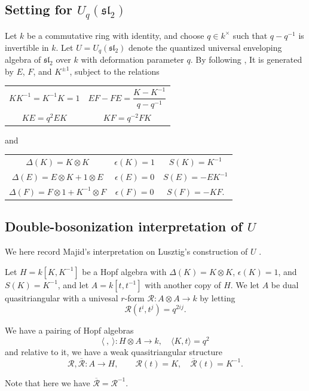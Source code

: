 
\subsection*{Setting for $U_q(\mathfrak{sl}_2)$}

Let $k$ be a commutative ring with identity, and choose $q \in k^\times$ such
that $q-q^{-1}$ is invertible in $k$.
Let $U = U_q(\mathfrak{sl}_2)$ denote the quantized universal enveloping
algebra of $\mathfrak{sl}_2$ over $k$ with deformation parameter $q$. 
By following \cite{Ohtsuki}, It is generated by $E$, $F$, and $K^{\pm 1}$, subject to the relations

\begin{center}
    \renewcommand{\arraystretch}{1.4}
    \begin{tabular}{@{}c@{\qquad}c@{}}
        $KK^{-1} = K^{-1}K = 1$ & $EF - FE = \dfrac{K - K^{-1}}{q - q^{-1}}$ \\
        $KE = q^2 EK$ & $KF = q^{-2} FK$
    \end{tabular}
\end{center}
and
\begin{center}
    \renewcommand{\arraystretch}{1.4}
    \begin{tabular}{@{}c@{\qquad}c@{\qquad}c@{}}
        $\Delta(K) = K \otimes K$ & $\epsilon(K) = 1$ & $S(K) = K^{-1}$ \\
        $\Delta(E) = E \otimes K + 1 \otimes E$ & $\epsilon(E) = 0$ & $S(E) = -EK^{-1}$ \\
        $\Delta(F) = F \otimes 1 + K^{-1} \otimes F$ & $\epsilon(F) = 0$ & $S(F) = -KF$.
    \end{tabular}
\end{center}

\subsection*{Double-bosonization interpretation of $U$}
We here record Majid's interpretation on Lusztig's construction of $U$ \cite{Majid99}.

Let $H = k[K, K^{-1}]$ be a Hopf algebra with $\Delta(K) = K \otimes K$, $\epsilon(K) = 1$, and $S(K) = K^{-1}$, and let $A = k[t,t^{-1}]$ with another copy of $H$.
We let $A$ be dual quasitriangular with a univesal $r$-form $\mathscr{R}: A \otimes A \rightarrow k$ by letting 
\[
\mathscr{R}(t^i, t^j) = q^{2ij}.
\]

\begin{lemma}\cite[Lemma 4.1.]{Majid99}
    We have a pairing of Hopf algebras
    \[
    \langle \ ,\ \rangle: H \otimes A \rightarrow k, \quad \langle K, t \rangle = q^2
    \]
    and relative to it, we have a weak quasitriangular structure
    \[
    \mathscr{R}, \overline{\mathscr{R}}: A \rightarrow H, \qquad \mathscr{R}(t) = K, \quad \overline{\mathscr{R}}(t) = K^{-1}.
    \]
\end{lemma}
Note that here we have $\overline{\mathscr{R}} = \mathscr{R}^{-1}$.

